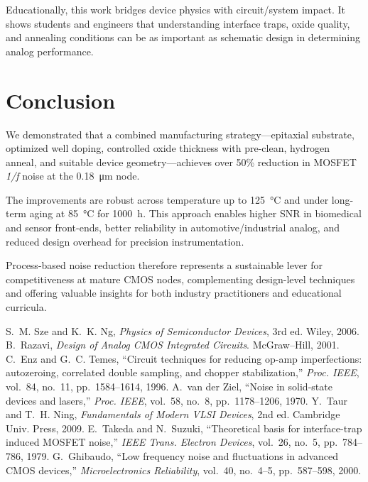\documentclass[conference]{IEEEtran}
\begin{document}
Educationally, this work bridges device physics with circuit/system impact. It shows students and engineers that understanding interface traps, oxide quality, and annealing conditions can be as important as schematic design in determining analog performance.

\section{Conclusion}
We demonstrated that a combined manufacturing strategy---epitaxial substrate, optimized well doping, controlled oxide thickness with pre-clean, hydrogen anneal, and suitable device geometry---achieves over 50\% reduction in MOSFET \emph{1/f} noise at the \SI{0.18}{\micro\meter} node. 

The improvements are robust across temperature up to \SI{125}{\celsius} and under long-term aging at \SI{85}{\celsius} for 1000~h. This approach enables higher SNR in biomedical and sensor front-ends, better reliability in automotive/industrial analog, and reduced design overhead for precision instrumentation. 

Process-based noise reduction therefore represents a sustainable lever for competitiveness at mature CMOS nodes, complementing design-level techniques and offering valuable insights for both industry practitioners and educational curricula.

\begin{thebibliography}{10}
S.~M. Sze and K.~K. Ng, \emph{Physics of Semiconductor Devices}, 3rd ed. Wiley, 2006.
B.~Razavi, \emph{Design of Analog CMOS Integrated Circuits}. McGraw--Hill, 2001.
C.~Enz and G.~C. Temes, ``Circuit techniques for reducing op-amp imperfections: autozeroing, correlated double sampling, and chopper stabilization,'' \emph{Proc. IEEE}, vol.~84, no.~11, pp.~1584--1614, 1996.
A.~van der Ziel, ``Noise in solid-state devices and lasers,'' \emph{Proc. IEEE}, vol.~58, no.~8, pp.~1178--1206, 1970.
Y.~Taur and T.~H. Ning, \emph{Fundamentals of Modern VLSI Devices}, 2nd ed. Cambridge Univ. Press, 2009.
E.~Takeda and N.~Suzuki, ``Theoretical basis for interface-trap induced MOSFET noise,'' \emph{IEEE Trans. Electron Devices}, vol.~26, no.~5, pp.~784--786, 1979.
G.~Ghibaudo, ``Low frequency noise and fluctuations in advanced CMOS devices,'' \emph{Microelectronics Reliability}, vol.~40, no.~4--5, pp.~587--598, 2000.
\end{thebibliography}
\end{document}

